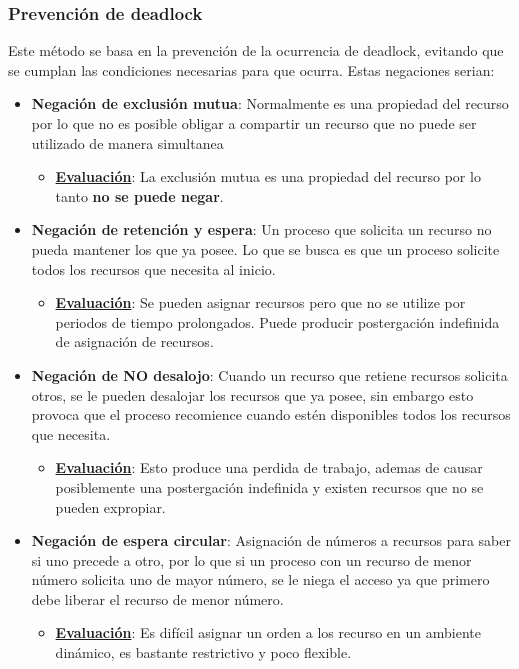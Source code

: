 \documentclass{templateNote}
\begin{document}
\subsubsection*{Prevención de deadlock}
Este método se basa en la prevención de la ocurrencia de deadlock, evitando que se cumplan las condiciones necesarias para que ocurra. Estas negaciones serian:
\begin{itemize}
    \item \textbf{Negación de exclusión mutua}: Normalmente es una propiedad del recurso por lo que no es posible obligar a compartir un recurso que no puede ser utilizado de manera simultanea
    \begin{itemize}
        \item \underline{\textbf{Evaluación}}: La exclusión mutua es una propiedad del recurso por lo tanto \textbf{no se puede negar}.
    \end{itemize}
    \item \textbf{Negación de retención y espera}: Un proceso que solicita un recurso no pueda mantener los que ya posee. Lo que se busca es que un proceso solicite todos los recursos que necesita al inicio.
    \begin{itemize}
        \item \underline{\textbf{Evaluación}}: Se pueden asignar recursos pero que no se utilize por periodos de tiempo prolongados. Puede producir postergación indefinida de asignación de recursos.
    \end{itemize}
    \item \textbf{Negación de NO desalojo}: Cuando un recurso que retiene recursos solicita otros, se le pueden desalojar los recursos que ya posee, sin embargo esto provoca que el proceso recomience cuando estén disponibles todos los recursos que necesita.
    \begin{itemize}
        \item \underline{\textbf{Evaluación}}: Esto produce una perdida de trabajo, ademas de causar posiblemente una postergación indefinida y existen recursos que no se pueden expropiar.
    \end{itemize}
    \item \textbf{Negación de espera circular}: Asignación de números a recursos para saber si uno precede a otro, por lo que si un proceso con un recurso de menor número solicita uno de mayor número, se le niega el acceso ya que primero debe liberar el recurso de menor número.
    \begin{itemize}
        \item \underline{\textbf{Evaluación}}: Es difícil asignar un orden a los recurso en un ambiente dinámico, es bastante restrictivo y poco flexible.
    \end{itemize} 
\end{itemize}
\end{document}
